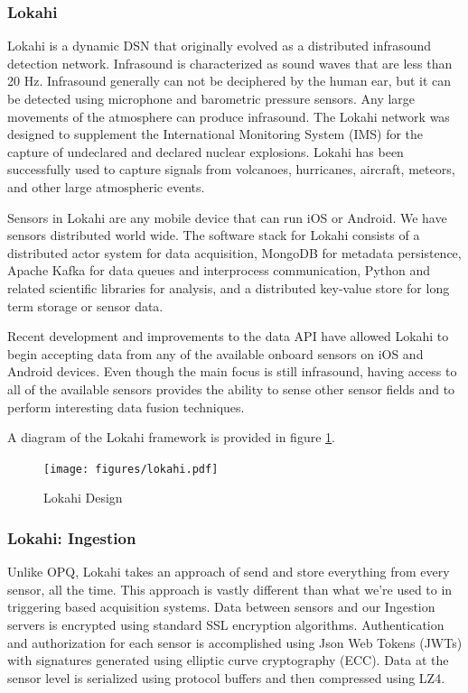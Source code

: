 \subsubsection{Lokahi}
Lokahi is a dynamic DSN that originally evolved as a distributed infrasound detection network. Infrasound is characterized as sound waves that are less than 20 Hz. Infrasound generally can not be deciphered by the human ear, but it can be detected using microphone and barometric pressure sensors. Any large movements of the atmosphere can produce infrasound. The Lokahi network was designed to supplement the International Monitoring System (IMS) for the capture  of undeclared and declared nuclear explosions. Lokahi has been successfully used to capture signals from volcanoes, hurricanes, aircraft, meteors, and other large atmospheric events. 

Sensors in Lokahi are any mobile device that can run iOS or Android. We have sensors distributed world wide. The software stack for Lokahi consists of a distributed actor system for data acquisition, MongoDB for metadata persistence, Apache Kafka for data queues and interprocess communication, Python and related scientific libraries for analysis, and a distributed key-value store for long term storage or sensor data.

Recent development and improvements to the data API have allowed Lokahi to begin accepting data from any of the available onboard sensors on iOS and Android devices. Even though the main focus is still infrasound, having access to all of the available sensors provides the ability to sense other sensor fields and to perform interesting data fusion techniques. 

A diagram of the Lokahi framework is provided in figure \ref{fig:lokahi}.


\begin{figure}
	\centering
	\texttt{[image: figures/lokahi.pdf]}
	\caption{Lokahi Design}\label{fig:lokahi}
\end{figure}

\subsubsection{Lokahi: Ingestion}
Unlike OPQ, Lokahi takes an approach of send and store everything from every sensor, all the time. This approach is vastly different than what we're used to in triggering based acquisition systems. Data between sensors and our Ingestion servers is encrypted using standard SSL encryption algorithms. Authentication and authorization for each sensor is accomplished using Json Web Tokens (JWTs) with signatures generated using elliptic curve cryptography (ECC). Data at the sensor level is serialized using protocol buffers and then compressed using LZ4. 

